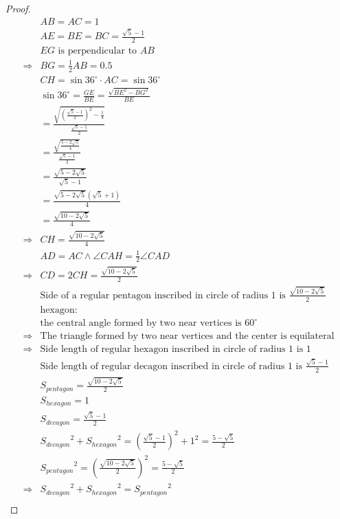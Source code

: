 \documentclass{article}
\begin{document}
\begin{proof}
    \begin{align*}
        &AB=AC=1\\
        &AE=BE=BC=\frac{\sqrt{5}-1}{2}\\
        &EG\text{ is perpendicular to }AB\\
        \Rightarrow&BG=\frac{1}{2}AB=0.5\\
        &CH=\sin 36^\circ\cdot AC=\sin 36^\circ\\
        &\sin36^\circ=\frac{GE}{BE}=\frac{\sqrt{BE^2-BG^2}}{BE}\\
        &=\frac{\sqrt{\left(\frac{\sqrt{5}-1}{2}\right)^2-\frac{1}{4}}}{\frac{\sqrt{5}-1}{2}}\\
        &=\frac{\sqrt{\frac{5-2\sqrt{5}}{4}}}{\frac{\sqrt{5}-1}{2}}\\
        &=\frac{\sqrt{5-2\sqrt{5}}}{\sqrt{5}-1}\\
        &=\frac{\sqrt{5-2\sqrt{5}}(\sqrt{5}+1)}{4}\\
        &=\frac{\sqrt{10-2\sqrt{5}}}{4}\\
        \Rightarrow&CH=\frac{\sqrt{10-2\sqrt{5}}}{4}\\
        &AD=AC\land \angle CAH=\frac{1}{2}\angle CAD\\
        \Rightarrow&CD=2CH=\frac{\sqrt{10-2\sqrt{5}}}{2}\\
        &\text{Side of a regular pentagon inscribed in circle of radius 1 is }\frac{\sqrt{10-2\sqrt{5}}}{2}\\
        &\text{hexagon}:\\
        &\text{the central angle formed by two near vertices is }60^\circ\\
        \Rightarrow&\text{The triangle formed by two near vertices and the center is equilateral}\\
        \Rightarrow&\text{Side length of regular hexagon inscribed in circle of radius 1 is } 1\\
        &\text{Side length of regular decagon inscribed in circle of radius 1 is } \frac{\sqrt{5}-1}{2}\\
        &S_{pentagon}=\frac{\sqrt{10-2\sqrt{5}}}{2}\\
        &S_{hexagon}=1\\
        &S_{decagon}=\frac{\sqrt{5}-1}{2}\\
        &{S_{decagon}}^2+{S_{hexagon}}^2=\left(\frac{\sqrt{5}-1}{2}\right)^2+1^2=\frac{5-\sqrt{5}}{2}\\
        &{S_{pentagon}}^2=\left(\frac{\sqrt{10-2\sqrt{5}}}{2}\right)^2=\frac{5-\sqrt{5}}{2}\\
        \Rightarrow&{S_{decagon}}^2+{S_{hexagon}}^2={S_{pentagon}}^2\\
    \end{align*}
\end{proof}
\end{document}
